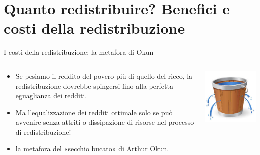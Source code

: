\documentclass[aspectratio=64,12pt]{beamer}
\begin{document}
\section{Quanto redistribuire? Benefici e costi della redistribuzione}


\begin{frame}{I costi della redistribuzione: la metafora di Okun}
\begin{columns}
\begin{column}{.75\columnwidth}
\begin{itemize}
\item Se pesiamo il reddito del povero più di quello del ricco, la
redistribuzione dovrebbe spingersi fino alla perfetta eguaglianza dei redditi.
\item Ma l'equalizzazione dei redditi ottimale solo se può avvenire senza attriti
o dissipazione di risorse nel processo di redistribuzione!
\item la metafora del «secchio bucato» di Arthur Okun.
\end{itemize}
\end{column}
\begin{column}{.25\columnwidth}
\begin{center}
\includegraphics[width=.9\linewidth]{./figure/leaky-bucket.jpeg}
\end{center}
\end{column}
\end{columns}
\bigskip


\end{frame}
\end{document}
